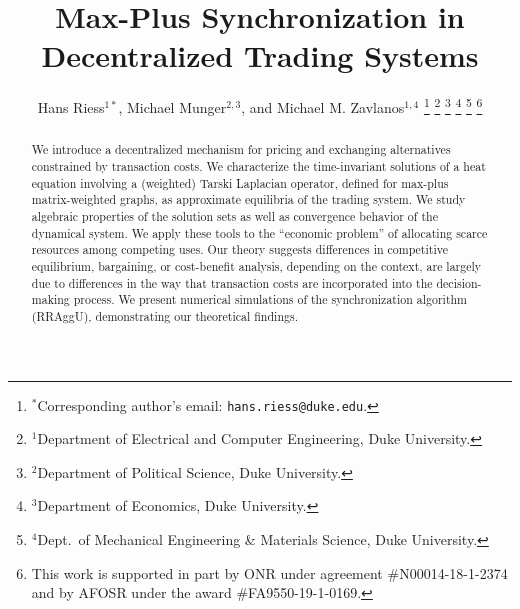 \documentclass[letterpaper, 10 pt, conference]{ieeeconf}
\begin{document}
\title{\bf Max-Plus Synchronization in Decentralized Trading Systems}

\author{Hans Riess$^{1\ast}$, Michael Munger$^{2,3}$, and Michael M. Zavlanos$^{1,4}$
\thanks{$^{\ast}$Corresponding author's email: \textbf{}\texttt{hans.riess@duke.edu}.}%
\thanks{$^{1}$Department of Electrical and Computer Engineering, Duke University.}%
\thanks{$^{2}$Department of Political Science, Duke University.}%
\thanks{$^{3}$Department of Economics, Duke University.}%
\thanks{$^{4}$Dept.~of Mechanical Engineering \& Materials Science, Duke University.}%
\thanks{This work is supported in part by ONR under agreement \#N00014-18-1-2374 and by AFOSR under the award \#FA9550-19-1-0169.}%
}


\maketitle


\begin{abstract}
We introduce a decentralized mechanism for pricing and exchanging alternatives constrained by transaction costs. We characterize the time-invariant solutions of a heat equation involving a (weighted) Tarski Laplacian operator, defined for max-plus matrix-weighted graphs, as approximate equilibria of the trading system. We study algebraic properties of the solution sets as well as convergence behavior of the dynamical system. We apply these tools to the ``economic problem'' of allocating scarce resources among competing uses. Our theory suggests differences in competitive equilibrium, bargaining, or cost-benefit analysis, depending on the context, are largely due to differences in the way that transaction costs are incorporated into the decision-making process. We present numerical simulations of the synchronization algorithm (RRAggU), demonstrating our theoretical findings.

\end{abstract}


\end{document}
